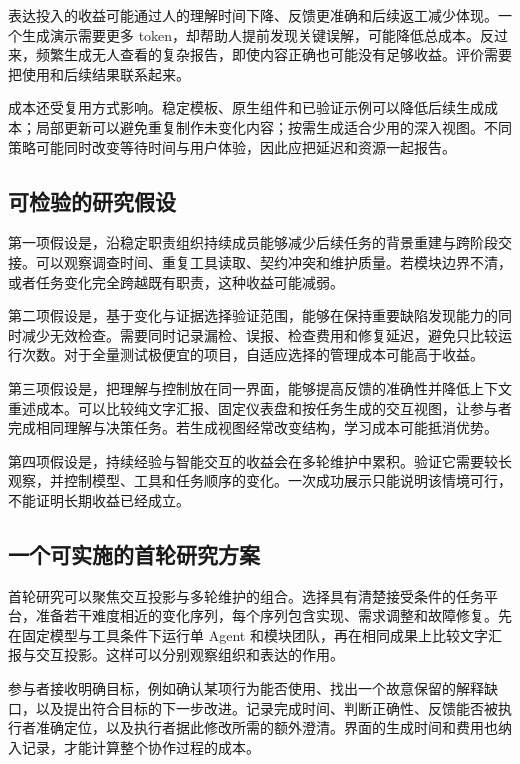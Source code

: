 表达投入的收益可能通过人的理解时间下降、反馈更准确和后续返工减少体现。一个生成演示需要更多 token，却帮助人提前发现关键误解，可能降低总成本。反过来，频繁生成无人查看的复杂报告，即使内容正确也可能没有足够收益。评价需要把使用和后续结果联系起来。


成本还受复用方式影响。稳定模板、原生组件和已验证示例可以降低后续生成成本；局部更新可以避免重复制作未变化内容；按需生成适合少用的深入视图。不同策略可能同时改变等待时间与用户体验，因此应把延迟和资源一起报告。

\subsection{可检验的研究假设}
第一项假设是，沿稳定职责组织持续成员能够减少后续任务的背景重建与跨阶段交接。可以观察调查时间、重复工具读取、契约冲突和维护质量。若模块边界不清，或者任务变化完全跨越既有职责，这种收益可能减弱。

第二项假设是，基于变化与证据选择验证范围，能够在保持重要缺陷发现能力的同时减少无效检查。需要同时记录漏检、误报、检查费用和修复延迟，避免只比较运行次数。对于全量测试极便宜的项目，自适应选择的管理成本可能高于收益。

第三项假设是，把理解与控制放在同一界面，能够提高反馈的准确性并降低上下文重述成本。可以比较纯文字汇报、固定仪表盘和按任务生成的交互视图，让参与者完成相同理解与决策任务。若生成视图经常改变结构，学习成本可能抵消优势。

第四项假设是，持续经验与智能交互的收益会在多轮维护中累积。验证它需要较长观察，并控制模型、工具和任务顺序的变化。一次成功展示只能说明该情境可行，不能证明长期收益已经成立。

\subsection{一个可实施的首轮研究方案}
首轮研究可以聚焦交互投影与多轮维护的组合。选择具有清楚接受条件的任务平台，准备若干难度相近的变化序列，每个序列包含实现、需求调整和故障修复。先在固定模型与工具条件下运行单 Agent 和模块团队，再在相同成果上比较文字汇报与交互投影。这样可以分别观察组织和表达的作用。

参与者接收明确目标，例如确认某项行为能否使用、找出一个故意保留的解释缺口，以及提出符合目标的下一步改进。记录完成时间、判断正确性、反馈能否被执行者准确定位，以及执行者据此修改所需的额外澄清。界面的生成时间和费用也纳入记录，才能计算整个协作过程的成本。

